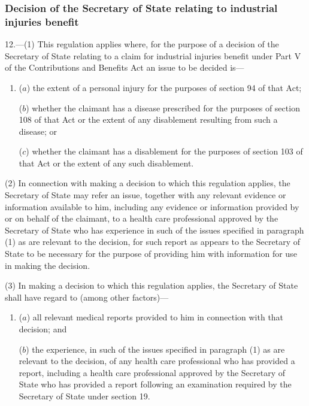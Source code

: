 \documentclass[12pt,a4paper]{article}
\begin{document}
\subsubsection[12. Decision of the Secretary of State relating to industrial injuries benefit]{Decision of the Secretary of State relating to industrial injuries benefit}

12.—(1) This regulation applies where, for the purpose of a decision of the Secretary of State relating to a claim for industrial injuries benefit under Part V of the Contributions and Benefits Act an issue to be decided is—
\begin{enumerate}\item[]
($a$) the extent of a personal injury for the purposes of section 94 of that Act;

($b$) whether the claimant has a disease prescribed for the purposes of section 108 of that Act or the extent of any disablement resulting from such a disease; or

($c$) whether the claimant has a disablement for the purposes of section 103 of that Act or the extent of any such disablement.
\end{enumerate}

(2) In connection with making a decision to which this regulation applies, the Secretary of State may refer an issue, together with any relevant evidence or information available to him, including any evidence or information provided by or on behalf of the claimant, to a 
health care professional approved by the Secretary of State  %
who has experience in such of the issues specified in paragraph (1) as are relevant to the decision, for such report as appears to the Secretary of State to be necessary for the purpose of providing him with information for use in making the decision.

(3) In making a decision to which this regulation applies, the Secretary of State shall have regard to (among other factors)—
\begin{enumerate}\item[]
($a$) all relevant medical reports provided to him in connection with that decision; and

($b$) the experience, in such of the issues specified in paragraph (1) as are relevant to the decision, of any 
health care professional  %
who has provided a report, including a 
health care professional approved by the Secretary of State  %
who has provided a report following an examination required by the Secretary of State under section 19.
\end{enumerate}
\end{document}
